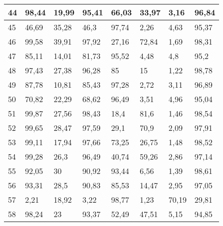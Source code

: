 \begin{longtable}[c]{|l|l|l|l|l|l|l|l|}
44              & 98,44        & 19,99        & 95,41       & 66,03         & 33,97         & 3,16          & 96,84         \\ \hline
45              & 46,69        & 35,28        & 46,3        & 97,74         & 2,26          & 4,63          & 95,37         \\ \hline
46              & 99,58        & 39,91        & 97,92       & 27,16         & 72,84         & 1,69          & 98,31         \\ \hline
47              & 85,11        & 14,01        & 81,73       & 95,52         & 4,48          & 4,8           & 95,2          \\ \hline
48              & 97,43        & 27,38        & 96,28       & 85            & 15            & 1,22          & 98,78         \\ \hline
49              & 87,78        & 10,81        & 85,43       & 97,28         & 2,72          & 3,11          & 96,89         \\ \hline
50              & 70,82        & 22,29        & 68,62       & 96,49         & 3,51          & 4,96          & 95,04         \\ \hline
51              & 99,87        & 27,56        & 98,43       & 18,4          & 81,6          & 1,46          & 98,54         \\ \hline
52              & 99,65        & 28,47        & 97,59       & 29,1          & 70,9          & 2,09          & 97,91         \\ \hline
53              & 99,11        & 17,94        & 97,66       & 73,25         & 26,75         & 1,48          & 98,52         \\ \hline
54              & 99,28        & 26,3         & 96,49       & 40,74         & 59,26         & 2,86          & 97,14         \\ \hline
55              & 92,05        & 30           & 90,92       & 93,44         & 6,56          & 1,39          & 98,61         \\ \hline
56              & 93,31        & 28,5         & 90,83       & 85,53         & 14,47         & 2,95          & 97,05         \\ \hline
57              & 2,21         & 18,92        & 3,22        & 98,77         & 1,23          & 70,19         & 29,81         \\ \hline
58              & 98,24        & 23           & 93,37       & 52,49         & 47,51         & 5,15          & 94,85         \\ \hline

\end{longtable}
